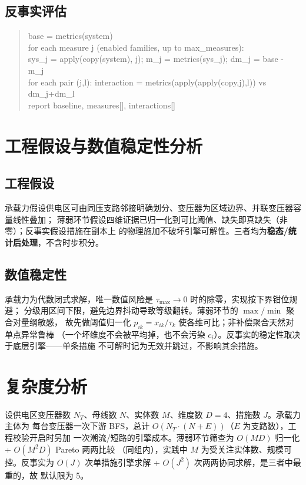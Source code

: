 \documentclass[UTF8,fontset=fandol,a4paper,11pt]{ctexart}
\begin{document}
\subsection{反事实评估}
\begin{quote}\footnotesize\ttfamily
base = metrics(system)\\
for each measure j (enabled families, up to max\_measures):\\
\hspace*{1em}sys\_j = apply(copy(system), j); m\_j = metrics(sys\_j); dm\_j = base - m\_j\\
for each pair (j,l): interaction = metrics(apply(apply(copy,j),l)) vs dm\_j+dm\_l\\
report baseline, measures[], interactions[]
\end{quote}

\section{工程假设与数值稳定性分析}
\subsection{工程假设}
承载力假设供电区可由同压支路邻接明确划分、变压器为区域边界、并联变压器容量线性叠加；
薄弱环节假设四维证据已归一化到可比阈值、缺失即真缺失（非零）；反事实假设措施在副本上
的物理施加不破坏引擎可解性。三者均为\textbf{稳态/统计后处理}，不含时步积分。

\subsection{数值稳定性}
承载力为代数闭式求解，唯一数值风险是 $\tau_{\max}\to0$ 时的除零，实现按下界钳位规避；
分级用区间下限，避免边界抖动导致等级翻转。薄弱环节的 $\max/\min$ 聚合对量纲敏感，
故先做阈值归一化 $p_{ik}=x_{ik}/\tau_k$ 使各维可比；非补偿聚合天然对单点异常鲁棒
（一个坏维度不会被平均掉，也不会污染 $c_i$）。反事实的稳定性取决于底层引擎——单条措施
不可解时记为无效并跳过，不影响其余措施。

\section{复杂度分析}
设供电区变压器数 $N_T$、母线数 $N$、实体数 $M$、维度数 $D=4$、措施数 $J$。承载力主体为
每台变压器一次下游 BFS，总计 $O(N_T\cdot(N+E))$（$E$ 为支路数），工程校验开启时另加
一次潮流/短路的引擎成本。薄弱环节筛查为 $O(M D)$ 归一化 + $O(M^2 D)$ Pareto 两两比较
（同组内），实践中 $M$ 为受关注实体数、规模可控。反事实为 $O(J)$ 次单措施引擎求解 +
$O(J^2)$ 次两两协同求解，是三者中最重的，故  默认限为 5。
\end{document}
